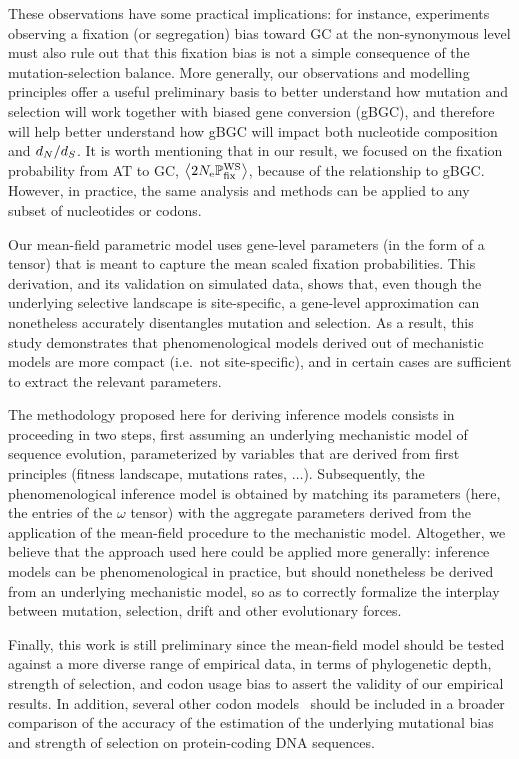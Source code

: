 \documentclass{article}
\begin{document}
These observations have some practical implications: for instance, experiments observing a fixation (or segregation) bias toward GC at the {non-synonymous} level must also rule out that this fixation bias is not a simple consequence of the mutation-selection balance.
More generally, our observations and modelling principles offer a useful preliminary basis to better understand how mutation and selection will work together with biased gene conversion ({gBGC}), and therefore will help better understand how {gBGC} will impact both nucleotide composition and $d_N / d_S$.
It is worth mentioning that in our result, we focused on the fixation probability from AT to GC, $\left\langle 2 N_{\text{e}} \mathbb{P}_{\text{fix}}^{\text{WS}} \right\rangle$, because of the relationship to {gBGC}.
However, in practice, the same analysis and methods can be applied to any subset of nucleotides or codons.

Our mean-field parametric model uses gene-level parameters (in the form of a tensor) that is meant to capture the mean scaled fixation probabilities.
This derivation, and its validation on simulated data, shows that, even though the underlying selective landscape is site-specific, a gene-level approximation can nonetheless accurately disentangles mutation and selection.
As a result, this study demonstrates that phenomenological models derived out of mechanistic models are more compact (i.e.~not site-specific), and in certain cases are sufficient to extract the relevant parameters.

The methodology proposed here for deriving inference models consists in proceeding in two steps, first assuming an underlying mechanistic model of sequence evolution, parameterized by variables that are derived from first principles (fitness landscape, mutations rates, $\hdots$).
Subsequently, the phenomenological inference model is obtained by matching its parameters (here, the entries of the $\omega$ tensor) with the aggregate parameters derived from the application of the mean-field procedure to the mechanistic model.
Altogether, we believe that the approach used here could be applied more generally: inference models can be phenomenological in practice, but should nonetheless be derived from an underlying mechanistic model, so as to correctly formalize the interplay between mutation, selection, drift and other evolutionary forces.

Finally, this work is still preliminary since the mean-field model should be tested against a more diverse range of empirical data, in terms of phylogenetic depth, strength of selection, and {codon usage bias} to assert the validity of our empirical results.
In addition, several other codon models~\citep{Rodrigue2008a,KosakovskyPond2020} should be included in a broader comparison of the accuracy of the estimation of the underlying mutational bias and strength of selection on protein-coding {DNA} sequences.
\end{document}
